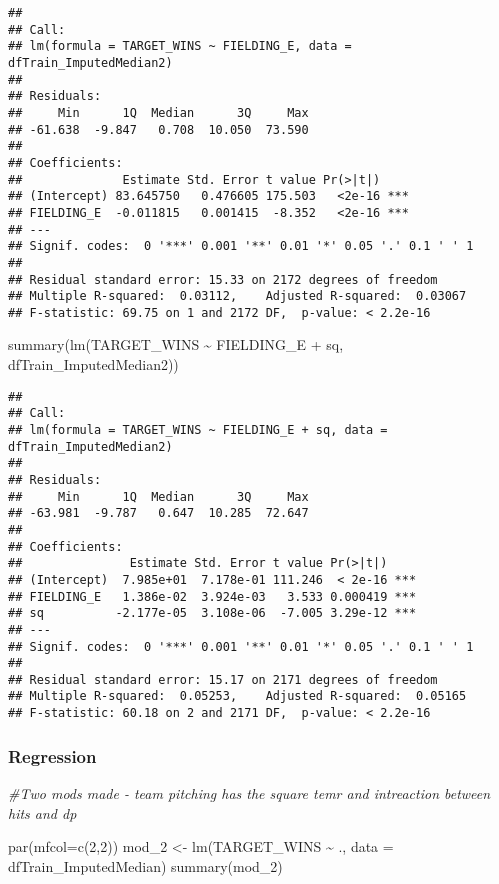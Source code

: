\documentclass[
]{article}
\newenvironment{Shaded}{\begin{snugshade}}{\end{snugshade}}
\newcommand{\AttributeTok}[1]{\textcolor[rgb]{0.77,0.63,0.00}{#1}}
\newcommand{\CommentTok}[1]{\textcolor[rgb]{0.56,0.35,0.01}{\textit{#1}}}
\newcommand{\DecValTok}[1]{\textcolor[rgb]{0.00,0.00,0.81}{#1}}
\newcommand{\FunctionTok}[1]{\textcolor[rgb]{0.00,0.00,0.00}{#1}}
\newcommand{\NormalTok}[1]{#1}
\newcommand{\OtherTok}[1]{\textcolor[rgb]{0.56,0.35,0.01}{#1}}
\newcommand{\SpecialCharTok}[1]{\textcolor[rgb]{0.00,0.00,0.00}{#1}}
\begin{document}
\begin{verbatim}
## 
## Call:
## lm(formula = TARGET_WINS ~ FIELDING_E, data = dfTrain_ImputedMedian2)
## 
## Residuals:
##     Min      1Q  Median      3Q     Max 
## -61.638  -9.847   0.708  10.050  73.590 
## 
## Coefficients:
##              Estimate Std. Error t value Pr(>|t|)    
## (Intercept) 83.645750   0.476605 175.503   <2e-16 ***
## FIELDING_E  -0.011815   0.001415  -8.352   <2e-16 ***
## ---
## Signif. codes:  0 '***' 0.001 '**' 0.01 '*' 0.05 '.' 0.1 ' ' 1
## 
## Residual standard error: 15.33 on 2172 degrees of freedom
## Multiple R-squared:  0.03112,    Adjusted R-squared:  0.03067 
## F-statistic: 69.75 on 1 and 2172 DF,  p-value: < 2.2e-16
\end{verbatim}

\begin{Shaded}
\begin{Highlighting}[]
\FunctionTok{summary}\NormalTok{(}\FunctionTok{lm}\NormalTok{(TARGET\_WINS }\SpecialCharTok{\textasciitilde{}}\NormalTok{ FIELDING\_E }\SpecialCharTok{+}\NormalTok{ sq, dfTrain\_ImputedMedian2))}
\end{Highlighting}
\end{Shaded}

\begin{verbatim}
## 
## Call:
## lm(formula = TARGET_WINS ~ FIELDING_E + sq, data = dfTrain_ImputedMedian2)
## 
## Residuals:
##     Min      1Q  Median      3Q     Max 
## -63.981  -9.787   0.647  10.285  72.647 
## 
## Coefficients:
##               Estimate Std. Error t value Pr(>|t|)    
## (Intercept)  7.985e+01  7.178e-01 111.246  < 2e-16 ***
## FIELDING_E   1.386e-02  3.924e-03   3.533 0.000419 ***
## sq          -2.177e-05  3.108e-06  -7.005 3.29e-12 ***
## ---
## Signif. codes:  0 '***' 0.001 '**' 0.01 '*' 0.05 '.' 0.1 ' ' 1
## 
## Residual standard error: 15.17 on 2171 degrees of freedom
## Multiple R-squared:  0.05253,    Adjusted R-squared:  0.05165 
## F-statistic: 60.18 on 2 and 2171 DF,  p-value: < 2.2e-16
\end{verbatim}

\hypertarget{regression}{%
\subsubsection{Regression}\label{regression}}

\begin{Shaded}
\begin{Highlighting}[]
\CommentTok{\#Two mods made {-} team pitching has the square temr and intreaction between hits and dp}

\FunctionTok{par}\NormalTok{(}\AttributeTok{mfcol=}\FunctionTok{c}\NormalTok{(}\DecValTok{2}\NormalTok{,}\DecValTok{2}\NormalTok{))}
\NormalTok{mod\_2 }\OtherTok{\textless{}{-}} \FunctionTok{lm}\NormalTok{(TARGET\_WINS }\SpecialCharTok{\textasciitilde{}}\NormalTok{ ., }\AttributeTok{data =}\NormalTok{ dfTrain\_ImputedMedian)}
\FunctionTok{summary}\NormalTok{(mod\_2)}
\end{Highlighting}
\end{Shaded}
\end{document}

